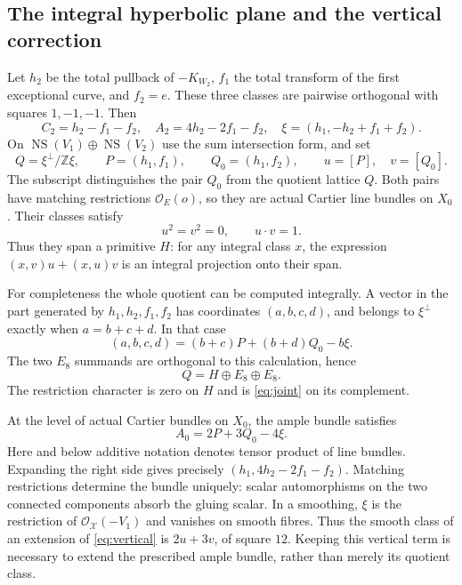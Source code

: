 \documentclass[11pt]{article}
\theoremstyle{definition}
\theoremstyle{remark}
\newcommand{\Z}{\mathbb Z}
\newcommand{\NS}{\operatorname{NS}}
\newcommand{\OO}{\mathcal O}
\begin{document}
\subsection{The integral hyperbolic plane and the vertical correction}
Let $h_2$ be the total pullback of $-K_{W_2}$, $f_1$ the total transform of the first exceptional curve, and $f_2=e$. These three classes are pairwise orthogonal with squares $1,-1,-1$. Then
\[
C_2=h_2-f_1-f_2,\quad A_2=4h_2-2f_1-f_2,\quad
\xi=(h_1,-h_2+f_1+f_2).
\]
On $\NS(V_1)\oplus\NS(V_2)$ use the sum intersection form, and set
\begin{equation}\label{eq:Q}
Q=\xi^\perp/\Z\xi,\qquad
P=(h_1,f_1),\qquad Q_0=(h_1,f_2),\qquad
u=[P],\quad v=[Q_0].
\end{equation}
The subscript distinguishes the pair $Q_0$ from the quotient lattice $Q$. Both pairs have matching restrictions $\OO_E(o)$, so they are actual Cartier line bundles on $X_0$. Their classes satisfy
\[
u^2=v^2=0,\qquad u\cdot v=1.
\]
Thus they span a primitive $H$: for any integral class $x$, the expression $(x,v)u+(x,u)v$ is an integral projection onto their span.

For completeness the whole quotient can be computed integrally. A vector in the part generated by $h_1,h_2,f_1,f_2$ has coordinates $(a,b,c,d)$, and belongs to $\xi^\perp$ exactly when $a=b+c+d$. In that case
\begin{equation}\label{eq:integral-splitting}
(a,b,c,d)=(b+c)P+(b+d)Q_0-b\xi.
\end{equation}
The two $E_8$ summands are orthogonal to this calculation, hence
\begin{equation}\label{eq:boundary-lattice}
Q=H\oplus E_8\oplus E_8.
\end{equation}
The restriction character is zero on $H$ and is \eqref{eq:joint} on its complement.

At the level of actual Cartier bundles on $X_0$, the ample bundle satisfies
\begin{equation}\label{eq:vertical}
A_0=2P+3Q_0-4\xi.
\end{equation}
Here and below additive notation denotes tensor product of line bundles. Expanding the right side gives precisely $(h_1,4h_2-2f_1-f_2)$. Matching restrictions determine the bundle uniquely: scalar automorphisms on the two connected components absorb the gluing scalar. In a smoothing, $\xi$ is the restriction of $\OO_{\mathcal X}(-V_1)$ and vanishes on smooth fibres. Thus the smooth class of an extension of \eqref{eq:vertical} is $2u+3v$, of square $12$. Keeping this vertical term is necessary to extend the prescribed ample bundle, rather than merely its quotient class.
\end{document}
